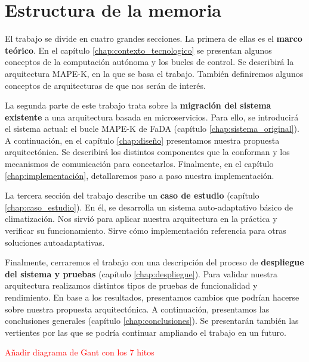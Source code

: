 \section{Estructura de la memoria}

El trabajo se divide en cuatro grandes secciones. La primera de ellas es el \textbf{marco teórico}. En el capítulo \ref{chap:contexto_tecnologico} se presentan algunos conceptos de la computación autónoma y los bucles de control. Se describirá la arquitectura MAPE-K, en la que se basa el trabajo. También definiremos algunos conceptos de arquitecturas de  que nos serán de interés.

La segunda parte de este trabajo trata sobre la \textbf{migración del sistema existente} a una arquitectura basada en microservicios. Para ello, se introducirá el sistema actual: el bucle MAPE-K  de FaDA (capítulo \ref{chap:sistema_original}). A continuación, en el capítulo \ref{chap:diseño} presentamos nuestra propuesta arquitectónica. Se describirá los distintos componentes que la conforman y los mecanismos de comunicación para conectarlos. Finalmente, en el capítulo \ref{chap:implementación}, detallaremos paso a paso nuestra implementación.

La tercera sección del trabajo describe un \textbf{caso de estudio} (capítulo \ref{chap:caso_estudio}). En él, se desarrolla un sistema auto-adaptativo básico de climatización. Nos sirvió para aplicar nuestra arquitectura en la práctica y verificar su funcionamiento. Sirve cómo implementación referencia para otras soluciones autoadaptativas.

Finalmente, cerraremos el trabajo con una descripción del proceso de \textbf{despliegue del sistema y pruebas} (capítulo \ref{chap:despliegue}). Para validar nuestra arquitectura realizamos distintos tipos de pruebas de funcionalidad y rendimiento. En base a los resultados, presentamos cambios que podrían hacerse sobre nuestra propuesta arquitectónica. A continuación, presentamos las conclusiones  generales (capítulo \ref{chap:conclusiones}). Se presentarán también las vertientes por las que se podría continuar ampliando el trabajo en un futuro.



\textcolor{red}{Añadir diagrama de Gant con los 7 hitos}
